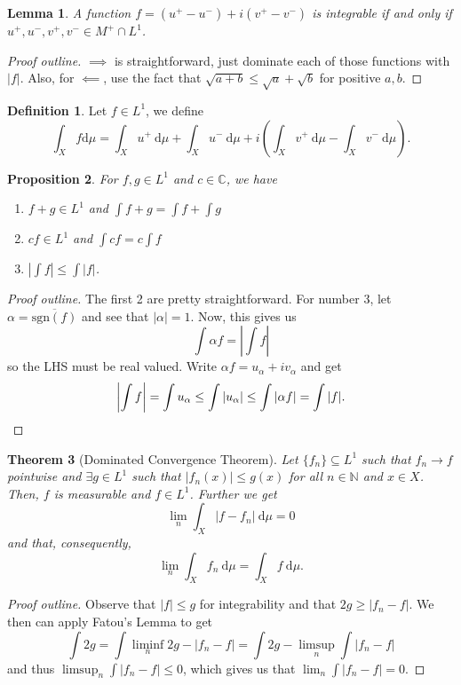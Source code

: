 \documentclass[letterpaper,12pt]{article}
\theoremstyle{definition}
\newtheorem{definition}{Definition}[section]
\theoremstyle{plain}
\newtheorem{thm}{Theorem}[section]
\newtheorem{proposition}[thm]{Proposition}
\newtheorem{lemma}[thm]{Lemma}
\theoremstyle{remark}
\newcommand{\N}{\mathbb{N}}
\newcommand{\C}{\mathbb{C}}
\begin{document}
\begin{lemma}
A function $f = (u^+-u^-)+i(v^+-v^-)$ is integrable if and only if $u^+,u^-,v^+,v^- \in M^+\cap L^1$. 
\end{lemma}

\begin{proof}[Proof outline]
$\implies$ is straightforward, just dominate each of those functions with $|f|$. Also, for $\impliedby$, use the fact that $\sqrt{a+b}\leq \sqrt{a}+\sqrt{b}$ for positive $a,b$.
\end{proof}

\begin{definition}
Let $f\in L^1$, we define
\[\int_X f \mathrm{d}\mu= \int_X u^+\ \mathrm{d}\mu + \int_X u^-\ \mathrm{d}\mu + i \left(\int_X v^+\ \mathrm{d}\mu - \int_X v^-\ \mathrm{d}\mu\right).\]
\end{definition}

\begin{proposition}
For $f,g\in L^1$ and $c\in \C$, we have 
\begin{enumerate}
  \item $f+g\in L^1$ and $\int f+g = \int f+\int g$
  \item $cf\in L^1$ and $\int cf = c\int f$
  \item $\left|\int f\right| \leq \int |f|$.
\end{enumerate}
\end{proposition}

\begin{proof}[Proof outline]
The first 2 are pretty straightforward. For number 3, let $\alpha = \overline{\mathrm{sgn}(f)}$ and see that $|\alpha|=1$. Now, this gives us
\[\int \alpha f = \left|\int f\right|\]
so the LHS must be real valued. Write $\alpha f = u_\alpha + iv_\alpha$ and get
\[\left|\int f\right| = \int u_\alpha \leq \int |u_\alpha| \leq \int|\alpha f| = \int|f|.\qedhere\]
\end{proof}

\begin{thm}[Dominated Convergence Theorem]
Let $\{f_n\}\subseteq L^1$ such that $f_n\to f$ pointwise and $\exists g\in L^1$ such that $|f_n(x)|\leq g(x)$ for all $n\in \N$ and $x\in X$. Then, $f$ is measurable and $f\in L^1$. Further we get
\[\lim_n \int_X |f-f_n|\ \mathrm{d}\mu = 0\]
and that, consequently,
\[\lim_n \int_X f_n\ \mathrm{d}\mu = \int_Xf\ \mathrm{d}\mu.\]
\end{thm}

\begin{proof}[Proof outline]
Observe that $|f|\leq g$ for integrability and that $2g\geq |f_n-f|$. We then can apply Fatou's Lemma to get
\[\int 2g = \int \liminf_n 2g-|f_n-f| = \int 2g - \limsup_n \int |f_n-f|\]
and thus $\limsup_n \int |f_n-f| \leq 0$, which gives us that $\lim_n \int |f_n-f| = 0$.
\end{proof}
\end{document}
